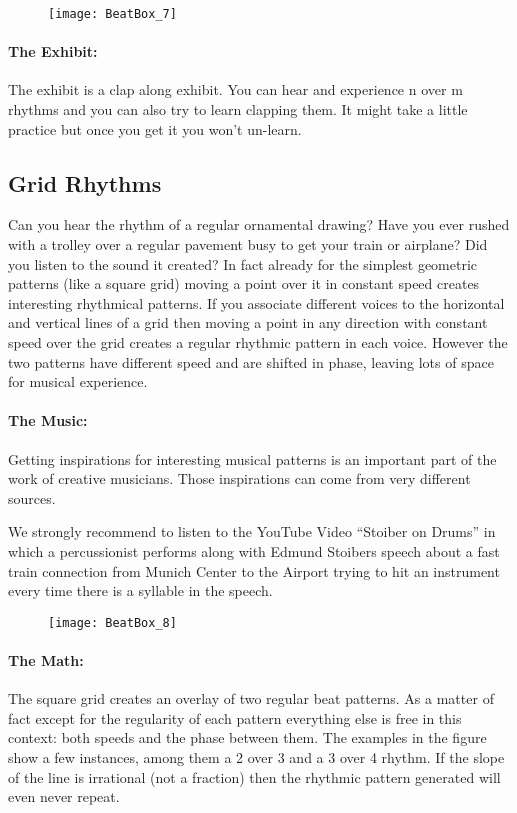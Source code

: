 \begin{figure}[h]
\centering
\texttt{[image: BeatBox\_7]}
\end{figure}

\paragraph{The Exhibit:} The exhibit is a clap along exhibit. You can hear and experience n over m rhythms and you can also try to learn clapping them. It might take a little practice but once you get it you won't un-learn.


\subsection{Grid Rhythms}
Can you hear the rhythm of a regular ornamental drawing? Have you ever rushed with a trolley over a regular pavement busy to get your train or airplane? Did you listen to the sound it created? In fact already for the simplest geometric patterns (like a square grid) moving a point over it in constant speed creates interesting rhythmical patterns. If you associate different voices to the horizontal and vertical lines of a grid then moving a point in any direction with constant speed over the grid creates a regular rhythmic pattern in each voice. However the two patterns have different speed and are shifted in phase, leaving lots of space for musical experience.

\paragraph{The Music:} Getting inspirations for interesting musical patterns is an important part of the work of creative musicians. Those inspirations can come from very different sources.

We strongly recommend to listen to the YouTube Video ``Stoiber on Drums'' in which a percussionist performs along with Edmund Stoibers speech about a fast train connection from Munich Center to the Airport trying to hit an instrument every time there is a syllable in the speech.

\begin{figure}[h]
\centering
\texttt{[image: BeatBox\_8]}
\end{figure}

\paragraph{The Math:} The square grid creates an overlay of two regular beat patterns. As a matter of fact except for the regularity of each pattern everything else is free in this context: both speeds and the phase between them. The examples in the figure show a few instances, among them a 2 over 3 and a 3 over 4 rhythm. If the slope of the line is irrational (not a fraction) then the rhythmic pattern generated will even never repeat.

